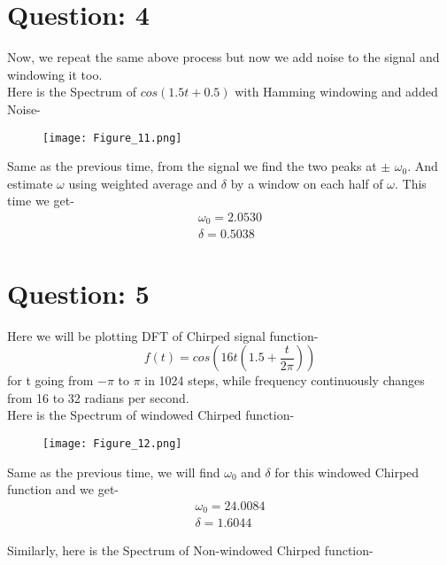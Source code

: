 \documentclass[12pt]{article}
\begin{document}
\newpage
\section*{Question: 4}

Now, we repeat the same above process but now we add noise to the signal and windowing it too.
\\Here is the Spectrum of $cos(1.5 t + 0.5)$ with Hamming windowing and added Noise-
\begin{figure}[h!]
\centering
\texttt{[image: Figure\_11.png]}
\label{fig:exemplo}
\end{figure}

Same as the previous time, from the signal we find the two peaks at $\pm$ $\omega_{0}$. And estimate $\omega$ using weighted average and $\delta$ by a window on each half of $\omega$. This time we get-
\begin{equation}
  \begin{aligned}
    \omega_{0} = 2.0530\\
    \delta = 0.5038
  \end{aligned}
\end{equation}

\newpage
\section*{Question: 5}

Here we will be plotting DFT of Chirped signal function-
\begin{equation*}
f(t)=cos(16t(1.5+\frac{t}{2\pi}))
\end{equation*}
for t going from −$\pi$ to $\pi$ in 1024 steps, while frequency continuously changes from 16 to 32 radians per second. 
\\Here is the Spectrum of windowed Chirped function-
\begin{figure}[h!]
\centering
\texttt{[image: Figure\_12.png]}
\label{fig:exemplo}
\end{figure}

Same as the previous time, we will find $\omega_{0}$ and $\delta$ for this windowed Chirped function and we get-
\begin{equation}
  \begin{aligned}
    \omega_{0} = 24.0084\\
    \delta = 1.6044
  \end{aligned}
\end{equation}

\newpage
Similarly, here is the Spectrum of Non-windowed Chirped function-
\end{document}
